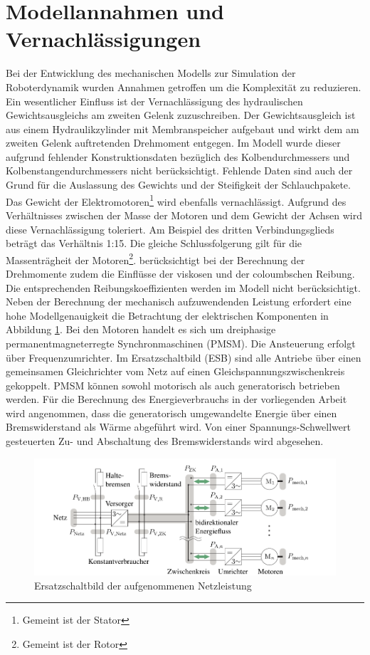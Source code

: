 \section{Modellannahmen und Vernachlässigungen}
Bei der Entwicklung des mechanischen Modells zur Simulation der Roboterdynamik wurden Annahmen getroffen um die Komplexität zu reduzieren. Ein wesentlicher Einfluss ist der Vernachlässigung des hydraulischen Gewichtsausgleichs am zweiten Gelenk zuzuschreiben. Der Gewichtsausgleich ist aus einem Hydraulikzylinder mit Membranspeicher aufgebaut und wirkt dem am zweiten Gelenk auftretenden Drehmoment entgegen. Im Modell wurde dieser aufgrund fehlender Konstruktionsdaten bezüglich des Kolbendurchmessers und Kolbenstangendurchmessers nicht berücksichtigt. Fehlende Daten sind auch der Grund für die Auslassung des Gewichts und der Steifigkeit der Schlauchpakete. Das Gewicht der Elektromotoren\footnote{Gemeint ist der Stator}  wird ebenfalls vernachlässigt. Aufgrund des Verhältnisses zwischen der Masse der Motoren und dem Gewicht der Achsen  wird diese Vernachlässigung toleriert. Am Beispiel des dritten Verbindungsglieds beträgt das Verhältnis 1:15.  Die gleiche Schlussfolgerung gilt für die Massenträgheit der Motoren\footnote{Gemeint ist der Rotor}. \cite[S.~287~f.]{Grimble.2009} berücksichtigt bei der Berechnung der Drehmomente zudem die Einflüsse der viskosen und der coloumbschen Reibung. Die entsprechenden Reibungskoeffizienten werden im Modell nicht berücksichtigt. Neben der Berechnung der mechanisch aufzuwendenden Leistung erfordert eine hohe Modellgenauigkeit die Betrachtung der elektrischen Komponenten in Abbildung \ref{fig:zk}. Bei den Motoren handelt es sich um dreiphasige permanentmagneterregte Synchronmaschinen (PMSM).  Die Ansteuerung erfolgt über Frequenzumrichter. Im Ersatzschaltbild (ESB) sind alle Antriebe über einen gemeinsamen Gleichrichter vom Netz auf einen Gleichspannungszwischenkreis gekoppelt. PMSM können sowohl motorisch als auch generatorisch betrieben werden. Für die Berechnung des Energieverbrauchs in der vorliegenden Arbeit wird angenommen, dass die generatorisch umgewandelte Energie über einen Bremswiderstand als Wärme abgeführt wird. Von einer Spannungs-Schwellwert gesteuerten Zu- und Abschaltung des Bremswiderstands wird abgesehen. \cite[S.~21~ff.]{Eggers.2019}

\begin{figure}[tbph]
	\centering
	\includegraphics[width=1\linewidth]{images/zk}
	\caption{Ersatzschaltbild der aufgenommenen Netzleistung \cite[S.~20]{Eggers.2019}}
	\label{fig:zk}
\end{figure}